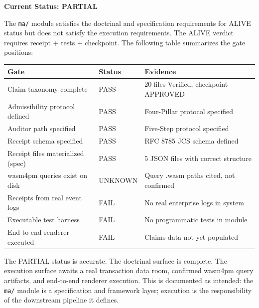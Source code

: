 \textbf{Current Status: PARTIAL}

The \texttt{ma/} module satisfies the doctrinal and specification requirements for ALIVE status
but does not satisfy the execution requirements. The ALIVE verdict requires receipt + tests +
checkpoint. The following table summarizes the gate positions:

\begin{center}
\begin{tabular}{lll}
\hline
\textbf{Gate} & \textbf{Status} & \textbf{Evidence} \\
\hline
Claim taxonomy complete & PASS & 20 files Verified, checkpoint APPROVED \\
Admissibility protocol defined & PASS & Four-Pillar protocol specified \\
Auditor path specified & PASS & Five-Step protocol specified \\
Receipt schema specified & PASS & RFC 8785 JCS schema defined \\
Receipt files materialized (spec) & PASS & 5 JSON files with correct structure \\
wasm4pm queries exist on disk & UNKNOWN & Query .wasm paths cited, not confirmed \\
Receipts from real event logs & FAIL & No real enterprise logs in system \\
Executable test harness & FAIL & No programmatic tests in module \\
End-to-end renderer executed & FAIL & Claims data not yet populated \\
\hline
\end{tabular}
\end{center}

The PARTIAL status is accurate. The doctrinal surface is complete. The execution surface awaits
a real transaction data room, confirmed wasm4pm query artifacts, and end-to-end renderer
execution. This is documented as intended: the \texttt{ma/} module is a specification and
framework layer; execution is the responsibility of the downstream pipeline it defines.
